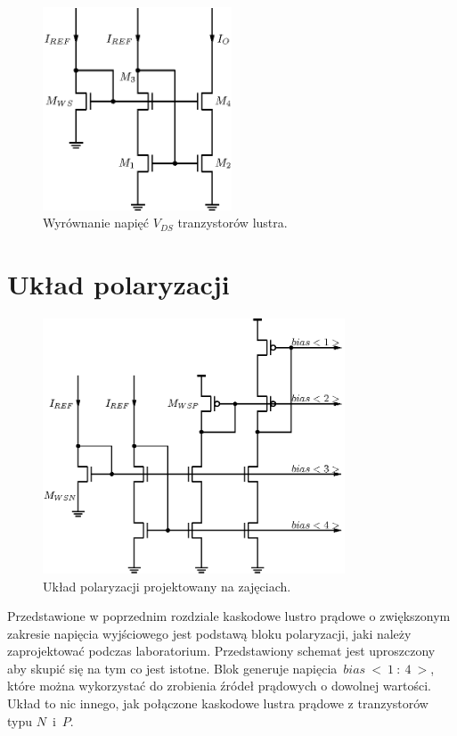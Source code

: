 \documentclass[twoside,pl,final]{labman}
\begin{document}
\begin{figure}[!htbp]
  \centering
  \includegraphics[width=0.5\textwidth]{cascode_vds}
  \caption{Wyrównanie napięć $V_{DS}$ tranzystorów lustra.}
  \label{fig:cascode:wideswing:vds}
\end{figure}

\chapter{Układ polaryzacji}
\label{bias}

\begin{figure}[!htbp]
  \centering
  \includegraphics[width=0.8\textwidth]{bias}
  \caption{Układ polaryzacji projektowany na zajęciach.}
  \label{fig:bias}
\end{figure}

Przedstawione w poprzednim rozdziale kaskodowe lustro prądowe o zwiększonym
zakresie napięcia wyjściowego jest podstawą bloku polaryzacji,
jaki należy zaprojektować podczas laboratorium.
Przedstawiony schemat jest uproszczony aby skupić się na tym co jest istotne.
Blok generuje napięcia~$bias~<~1~:~4~>$,
które można wykorzystać do zrobienia źródeł prądowych o dowolnej wartości.
Układ to nic innego, jak połączone kaskodowe
lustra prądowe z tranzystorów typu $N$~i~$P$.
\end{document}
